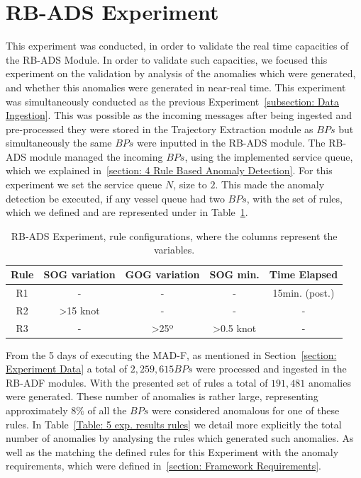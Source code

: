 \section{RB-ADS Experiment}
\label{section: RB-ADS Experiment}
This experiment was conducted, in order to validate the real time capacities of the RB-ADS Module. In order to validate such capacities, we focused this experiment on the validation by analysis of the anomalies which were generated, and whether this anomalies were generated in near-real time.
This experiment was simultaneously conducted as the previous Experiment~\ref{subsection: Data Ingestion}. This was possible as the incoming messages after being ingested and pre-processed they were stored in the Trajectory Extraction module as $BPs$ but simultaneously the same $BPs$ were inputted in the RB-ADS module.
The RB-ADS module managed the incoming $BPs$, using the implemented service queue, which we explained in~\ref{section: 4 Rule Based Anomaly Detection}. For this experiment we set the service queue $N$, size to \textbf{$2$}. This made the anomaly detection be executed, if any vessel queue had two $BPs$, with the set of rules, which we defined and are represented under in Table~\ref{Table: 5 exp. RB-ADS rules}. 

\begin{table}[H]
\centering
\caption{RB-ADS Experiment, rule configurations, where the columns represent the variables.}
\label{Table: 5 exp. RB-ADS rules}
\begin{tabular}{@{}ccccc@{}}
\toprule
Rule & SOG variation & GOG variation & SOG min. & Time Elapsed \\ \midrule
R1 & - & - & - & 15min. (post.) \\
R2 & \textgreater{}15 knot & - & - & - \\
R3 & - & \textgreater 25º & \textgreater 0.5 knot & - \\ \bottomrule
\end{tabular}
\end{table}

From the 5 days of executing the MAD-F, as mentioned in Section~\ref{section: Experiment Data} a total of $2,259,615 BPs$ were processed and ingested in the RB-ADF modules. With the presented set of rules a total of $191,481$ anomalies were generated. These number of anomalies is rather large, representing approximately $8\%$ of all the $BPs$ were considered anomalous for one of these rules. In Table~\ref{Table: 5 exp. results rules} we detail more explicitly the total number of anomalies by analysing the rules which generated such anomalies. As well as the matching the defined rules for this Experiment with the anomaly requirements, which were defined in~\ref{section: Framework Requirements}.


